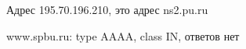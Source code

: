 \documentclass[a4paper,11pt]{article}
\begin{document}
\begin{center}
\label{fig:image}
\end{center}
Адрес 195.70.196.210, это адрес ns2.pu.ru

\begin{center}
\label{fig:image}
\end{center}
www.spbu.ru: type AAAA, class IN, ответов нет
\end{document}
